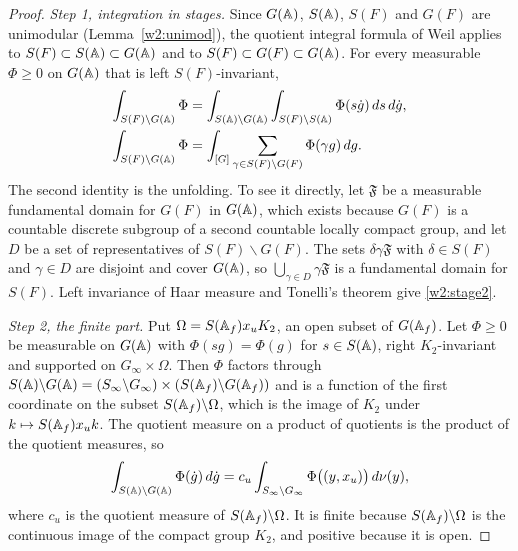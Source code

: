 \begin{proof}
\emph{Step 1, integration in stages.} Since $G(\mathbb A)$, $S(\mathbb A)$, $S(F)$ and $G(F)$ are unimodular (Lemma~\ref{w2:unimod}), the quotient integral formula of Weil \cite[\S2.6]{w2folland} applies to $S(F)\subset S(\mathbb A)\subset G(\mathbb A)$ and to $S(F)\subset G(F)\subset G(\mathbb A)$. For every measurable $\Phi\ge0$ on $G(\mathbb A)$ that is left $S(F)$-invariant,
\begin{align}
\int_{S(F)\backslash G(\mathbb A)}\Phi&=\int_{S(\mathbb A)\backslash G(\mathbb A)}\int_{S(F)\backslash S(\mathbb A)}\Phi(s\dot g)\,ds\,d\dot g,\label{w2:stage1}\\
\int_{S(F)\backslash G(\mathbb A)}\Phi&=\int_{[G]}\sum_{\gamma\in S(F)\backslash G(F)}\Phi(\gamma g)\,dg.\label{w2:stage2}
\end{align}
The second identity is the unfolding. To see it directly, let $\mathfrak F$ be a measurable fundamental domain for $G(F)$ in $G(\mathbb A)$, which exists because $G(F)$ is a countable discrete subgroup of a second countable locally compact group, and let $D$ be a set of representatives of $S(F)\backslash G(F)$. The sets $\delta\gamma\mathfrak F$ with $\delta\in S(F)$ and $\gamma\in D$ are disjoint and cover $G(\mathbb A)$, so $\bigcup_{\gamma\in D}\gamma\mathfrak F$ is a fundamental domain for $S(F)$. Left invariance of Haar measure and Tonelli's theorem give \eqref{w2:stage2}.

\emph{Step 2, the finite part.} Put $\Omega=S(\mathbb A_f)x_uK_2$, an open subset of $G(\mathbb A_f)$. Let $\Phi\ge0$ be measurable on $G(\mathbb A)$ with $\Phi(sg)=\Phi(g)$ for $s\in S(\mathbb A)$, right $K_2$-invariant and supported on $G_\infty\times\Omega$. Then $\Phi$ factors through $S(\mathbb A)\backslash G(\mathbb A)=(S_\infty\backslash G_\infty)\times(S(\mathbb A_f)\backslash G(\mathbb A_f))$ and is a function of the first coordinate on the subset $S(\mathbb A_f)\backslash\Omega$, which is the image of $K_2$ under $k\mapsto S(\mathbb A_f)x_uk$. The quotient measure on a product of quotients is the product of the quotient measures, so
\begin{equation}\label{w2:finite}
\int_{S(\mathbb A)\backslash G(\mathbb A)}\Phi(\dot g)\,d\dot g=c_u\int_{S_\infty\backslash G_\infty}\Phi\bigl((y,x_u)\bigr)\,d\nu(y),
\end{equation}
where $c_u$ is the quotient measure of $S(\mathbb A_f)\backslash\Omega$. It is finite because $S(\mathbb A_f)\backslash\Omega$ is the continuous image of the compact group $K_2$, and positive because it is open.


\end{proof}
